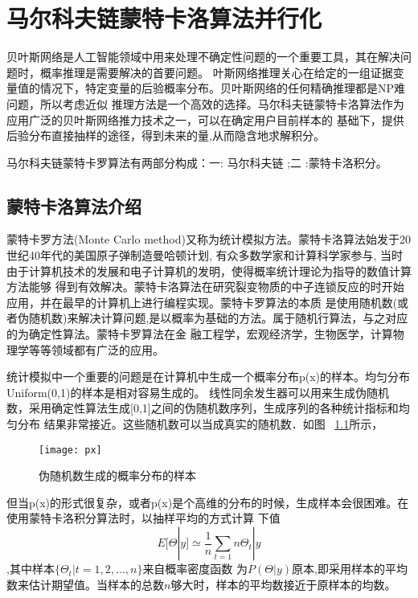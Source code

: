 
\chapter[马尔科夫链蒙特卡洛算法并行化]{马尔科夫链蒙特卡洛算法并行化}
    贝叶斯网络是人工智能领域中用来处理不确定性问题的一个重要工具，其在解决问题时，概率推理是需要解决的首要问题。
叶斯网络推理关心在给定的一组证据变量值的情况下，特定变量的后验概率分布。贝叶斯网络的任何精确推理都是NP难问题，所以考虑近似
推理方法是一个高效的选择。马尔科夫链蒙特卡洛算法作为应用广泛的贝叶斯网络推力技术之一，可以在确定用户目前样本的
基础下，提供后验分布直接抽样的途径，得到未来的量,从而隐含地求解积分。

马尔科夫链蒙特卡罗算法有两部分构成：一: 马尔科夫链 ;二 :蒙特卡洛积分。
\section{蒙特卡洛算法介绍}
    蒙特卡罗方法(Monte Carlo method)又称为统计模拟方法。蒙特卡洛算法始发于20世纪40年代的美国原子弹制造曼哈顿计划,
有众多数学家和计算科学家参与, 当时由于计算机技术的发展和电子计算机的发明，使得概率统计理论为指导的数值计算方法能够
得到有效解决。蒙特卡洛算法在研究裂变物质的中子连锁反应的时开始应用，并在最早的计算机上进行编程实现。蒙特卡罗算法的本质
是使用随机数(或者伪随机数)来解决计算问题,是以概率为基础的方法。属于随机行算法，与之对应的为确定性算法。蒙特卡罗算法在金
融工程学，宏观经济学，生物医学，计算物理学等等领域都有广泛的应用。

    统计模拟中一个重要的问题是在计算机中生成一个概率分布p(x)的样本。均匀分布Uniform(0,1)的样本是相对容易生成的。 
线性同余发生器可以用来生成伪随机数，采用确定性算法生成[0,1]之间的伪随机数序列，生成序列的各种统计指标和均匀分布
结果非常接近。这些随机数可以当成真实的随机数．如图 ~\ref{fig:px}所示，

    \begin{figure}[htbp]
    \centering
    \texttt{[image: px]}
    \caption{伪随机数生成的概率分布的样本}\label{fig:px}
    \vspace{\baselineskip}
    \end{figure}

    但当p(x)的形式很复杂，或者p(x)是个高维的分布的时候，生成样本会很困难。在使用蒙特卡洛积分算法时，以抽样平均的方式计算
    下值$$E[\Theta|y] \simeq \frac{1}{n} \sum_{t=1}{n}\Theta_t|y$$,其中样本$\{\Theta_t|t=1,2,\ldots,n\}$来自概率密度函数
为$P(\Theta|y)$原本,即采用样本的平均数来估计期望值。当样本的总数$n$够大时，样本的平均数接近于原样本的均数。
    
